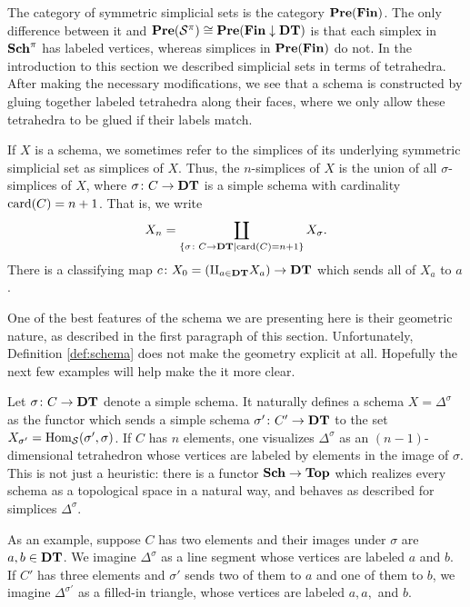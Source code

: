 \documentclass{amsart}
\def\DT{{\bf DT}}
\def\Sch{{\bf Sch}}
\def\Fin{{\bf Fin}}
\def\card{\tn{card}}
\begin{document}
\begin{remark}\label{rem:symmetric}

The category of symmetric simplicial sets is the category $\Pre(\Fin)$.  The only difference between it and $\Pre(\mcS^\pi)\iso\Pre(\Fin\down\DT)$ is that each simplex in $\Sch^\pi$ has labeled vertices, whereas simplices in $\Pre(\Fin)$ do not.  In the introduction to this section we described simplicial sets in terms of tetrahedra.  After making the necessary modifications, we see that a schema is constructed by gluing together labeled tetrahedra along their faces, where we only allow these tetrahedra to be glued if their labels match.

If $X$ is a schema, we sometimes refer to the simplices of its underlying symmetric simplicial set as simplices of $X$.  Thus, the $n$-simplices of $X$ is the union of all $\sigma$-simplices of $X$, where $\sigma\taking C\to\DT$ is a simple schema with cardinality $\card(C)=n+1$.  That is, we write $$X_n=\coprod_{\{\sigma\taking C\to\DT| \card(C)=n+1\}}X_\sigma.$$  There is a classifying map $c\taking X_0=\left(\amalg_{a\in\DT}X_a\right)\to\DT$ which sends all of $X_a$ to $a$.

\end{remark}

One of the best features of the schema we are presenting here is their geometric nature, as described in the first paragraph of this section.  Unfortunately, Definition \ref{def:schema} does not make the geometry explicit at all.  Hopefully the next few examples will help make the it more clear.

\begin{example}\label{ex:simplices}

Let $\sigma\taking C\to\DT$ denote a simple schema.  It naturally defines a schema $X=\Delta^\sigma$ as the functor which sends a simple schema $\sigma'\taking C'\to\DT$ to the set $X_{\sigma'}=\textnormal{Hom}_\mathcal{S}(\sigma',\sigma)$.  If $C$ has $n$ elements, one visualizes $\Delta^\sigma$ as an $(n-1)$-dimensional tetrahedron whose vertices are labeled by elements in the image of $\sigma$.  This is not just a heuristic: there is a functor $\Sch\to\Top$ which realizes every schema as a topological space in a natural way, and behaves as described for simplices $\Delta^\sigma$.

As an example, suppose $C$ has two elements and their images under $\sigma$ are $a,b\in\DT$.  We imagine $\Delta^\sigma$ as a line segment whose vertices are labeled $a$ and $b$.  If $C'$ has three elements and $\sigma'$ sends two of them to $a$ and one of them to $b$, we imagine $\Delta^{\sigma'}$ as a filled-in triangle, whose vertices are labeled $a,a,$ and $b$. 

\end{example}
\end{document}
